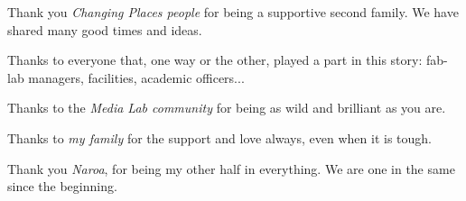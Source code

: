 Thank you \textit{Changing Places people} for being a supportive second family. \newline We have shared many good times and ideas. 

Thanks to everyone that, one way or the other, played a part in this story: fab-lab managers, facilities, academic officers...

Thanks to the \textit{Media Lab community} for being as wild and brilliant as you are. 

Thanks to \textit{my family} for the support and love always, even when it is tough.

Thank you \textit{Naroa}, for being my other half in everything. \newline We are one in the same since the beginning.

\restoregeometry

